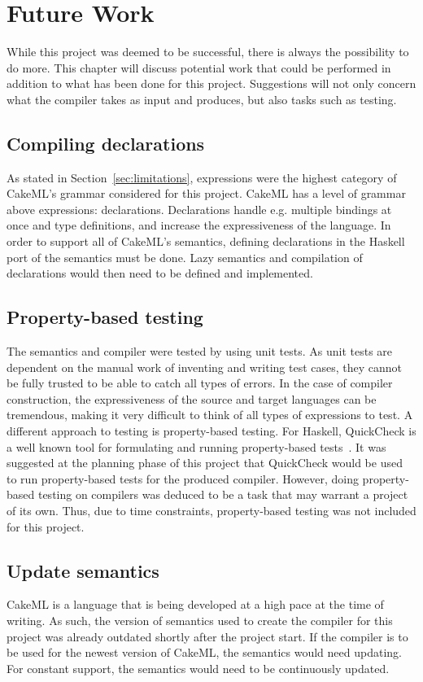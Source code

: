 \chapter{Future Work}

While this project was deemed to be successful, there is always the possibility
to do more. This chapter will discuss potential work that could be performed in
addition to what has been done for this project. Suggestions will not only
concern what the compiler takes as input and produces, but also tasks such as
testing.

\section{Compiling declarations}
As stated in Section~\ref{sec:limitations}, expressions were the highest
category of CakeML's grammar considered for this project. CakeML has a level
of grammar above expressions: declarations. Declarations handle e.g. multiple
bindings at once and type definitions, and increase the expressiveness of the
language. In order to support all of CakeML's semantics, defining declarations
in the Haskell port of the semantics must be done. Lazy semantics and
compilation of declarations would then need to be defined and implemented.

\section{Property-based testing}
The semantics and compiler were tested by using unit tests.
As unit tests are dependent on the manual work of inventing and writing
test cases, they cannot be fully trusted to be able to catch all types of
errors. In the case of compiler construction, the expressiveness of the
source and target languages can be tremendous, making it very difficult to
think of all types of expressions to test. A different approach to testing
is property-based testing. For Haskell, QuickCheck is a well known tool for
formulating and running property-based
tests~\cite{Claessen:2000:QLT:351240.351266}.
It was suggested at the planning phase of this project that QuickCheck would
be used to run property-based tests for the produced compiler. However, doing
property-based testing on compilers was deduced to be a task that may warrant
a project of its own. Thus, due to time constraints, property-based testing
was not included for this project.

\section{Update semantics}
CakeML is a language that is being developed at a high pace at the time of
writing. As such, the version of semantics used to create the compiler for this
project was already outdated shortly after the project start. If the compiler
is to be used for the newest version of CakeML, the semantics would need
updating. For constant support, the semantics would need to be continuously
updated.

